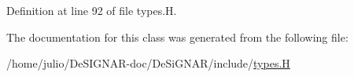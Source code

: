 Definition at line 92 of file types.\+H.



The documentation for this class was generated from the following file\+:\begin{DoxyCompactItemize}
\item 
/home/julio/\+De\+S\+I\+G\+N\+A\+R-\/doc/\+De\+Si\+G\+N\+A\+R/include/\hyperlink{types_8_h}{types.\+H}\end{DoxyCompactItemize}
